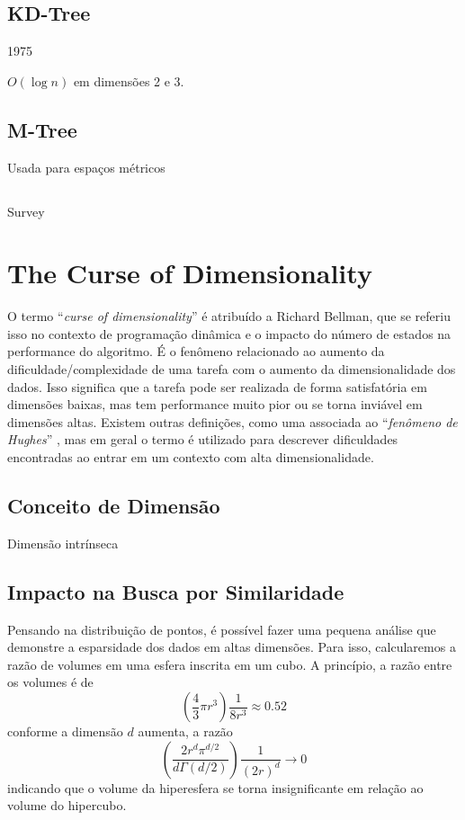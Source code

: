\subsection{KD-Tree}

1975 \cite{kdtree:wiki,kdtree:bentley1975}

$O(\log n)$ em dimensões 2 e 3.

\subsection{M-Tree}

Usada para espaços métricos

\subsection{}

Survey \cite{multidimensionalmethods:gaede1998}

\section{The Curse of Dimensionality}

O termo ``\textit{curse of dimensionality}'' é atribuído a Richard Bellman, que se referiu isso no contexto de programação dinâmica e o impacto do número de estados na performance do algoritmo. É o fenômeno relacionado ao aumento da dificuldade/complexidade de uma tarefa com o aumento da dimensionalidade dos dados. Isso significa que a tarefa pode ser realizada de forma satisfatória em dimensões baixas, mas tem performance muito pior ou se torna inviável em dimensões altas. Existem outras definições, como uma associada ao ``\textit{fenômeno de Hughes}'' \cite{meanacc:hughes1968}, mas em geral o termo é utilizado para descrever dificuldades encontradas ao entrar em um contexto com alta dimensionalidade. 

\subsection{Conceito de Dimensão}

Dimensão intrínseca

\subsection{Impacto na Busca por Similaridade}

Pensando na distribuição de pontos, é possível fazer uma pequena análise que demonstre a esparsidade dos dados em altas dimensões. Para isso, calcularemos a razão de volumes em uma esfera inscrita em um cubo. A princípio, a razão entre os volumes é de
$$\left(\frac{4}{3} \pi r^3\right)\frac{1}{8r^3} \approx 0.52$$
conforme a dimensão $d$ aumenta, a razão 
$$\left(\frac{2r^d\pi^{d/2}}{d\Gamma(d/2)}\right)\frac{1}{(2r)^d} \to 0$$
indicando que o volume da hiperesfera se torna insignificante em relação ao volume do hipercubo. \cite{cursedim:wiki}

